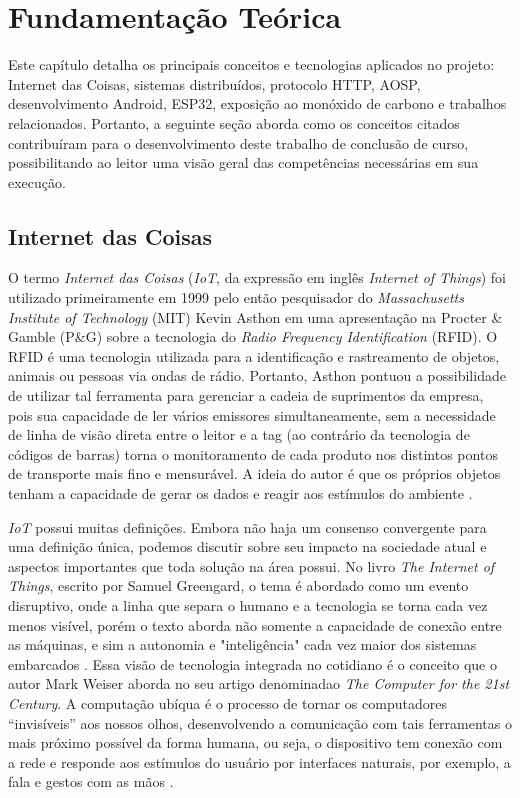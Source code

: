 \chapter{Fundamentação Teórica}

Este capítulo detalha os principais conceitos e tecnologias aplicados no projeto: Internet das Coisas, sistemas distribuídos, protocolo HTTP, AOSP, desenvolvimento Android, ESP32, exposição ao monóxido de carbono e trabalhos relacionados. Portanto, 
a seguinte seção aborda como os conceitos citados contribuíram para o desenvolvimento deste trabalho de conclusão de curso, possibilitando
ao leitor uma visão geral das competências necessárias em sua execução. 

\section{Internet das Coisas}

O termo \textit{Internet das Coisas} (\textit{IoT}, da expressão em inglês \textit{Internet of Things}) foi utilizado primeiramente em 1999 pelo então pesquisador do \textit{Massachusetts Institute of Technology} (MIT) Kevin Asthon em uma apresentação na Procter \& Gamble (P\&G) sobre a tecnologia do \textit{Radio Frequency Identification} (RFID). O RFID é uma tecnologia utilizada para a identificação e rastreamento de objetos, animais ou pessoas via ondas de rádio. Portanto, Asthon pontuou a possibilidade de utilizar tal ferramenta para gerenciar a cadeia de suprimentos da empresa, pois sua capacidade de ler vários emissores simultaneamente, sem a necessidade de linha de visão direta entre o leitor e a tag (ao contrário da tecnologia de códigos de barras) torna o monitoramento de cada produto nos distintos pontos de transporte mais fino e mensurável. A ideia do autor 
é que os próprios objetos tenham a capacidade de gerar os dados e reagir aos estímulos do ambiente \cite{iot-first-definition}.

\textit{IoT} possui muitas definições. Embora não haja um consenso convergente para uma definição única, podemos discutir sobre seu impacto na sociedade atual e aspectos importantes que toda solução na área possui. No livro \textit{The Internet  of Things}, escrito por Samuel Greengard, o tema é abordado como um evento disruptivo, onde a linha que separa o humano e a tecnologia se torna cada vez menos visível, porém o texto aborda não somente a capacidade de conexão entre as máquinas, e sim a autonomia e "inteligência" cada vez maior dos sistemas embarcados \cite[pp. 17]{book-iot}. Essa visão de tecnologia integrada no cotidiano é o conceito que o autor Mark Weiser aborda no seu artigo denominadao \textit{The Computer for the 21st Century}. A computação ubíqua é o processo de tornar os computadores ``invisíveis'' aos nossos olhos, desenvolvendo a comunicação com tais ferramentas o mais próximo possível da forma humana, ou seja, o dispositivo tem conexão com a rede e responde aos estímulos do usuário por interfaces naturais, por exemplo, a fala e gestos com as mãos \cite{ubiquitous-computing}.

